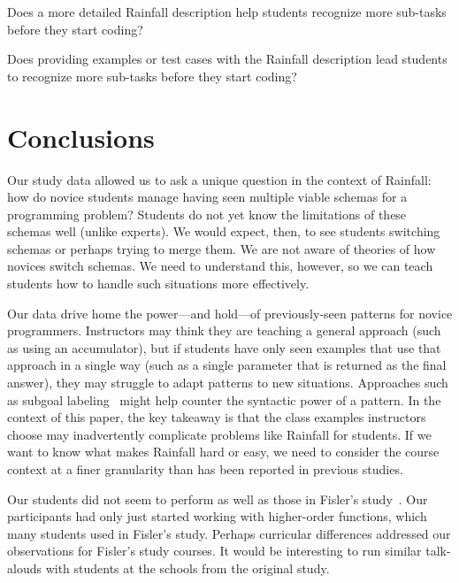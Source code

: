 \begin{openq}
Does a more detailed Rainfall description help students recognize
more sub-tasks before they start coding?
\end{openq}

\begin{openq}
Does providing examples or test cases with the Rainfall description
lead students to recognize more sub-tasks before they start coding?
\end{openq}





\section{Conclusions}

Our study data allowed us to ask a unique question in the context of
Rainfall: how do novice students manage having seen multiple viable
schemas for a programming problem?  Students
do not yet know the limitations of these schemas well (unlike experts). We would
expect, then, to see students switching schemas or perhaps trying to
merge them.  We are not aware of theories of how novices switch
schemas. We need to understand this, however, so we can teach students
how to handle such situations more effectively.

Our data drive home the power---and hold---of previously-seen patterns
for novice programmers.  Instructors may think they are teaching a
general approach (such as using an accumulator), but if students have
only seen examples that use that approach in a single way (such as a
single parameter that is returned as the final answer), they may
struggle to adapt patterns to new situations.  Approaches such as
subgoal labeling~\cite{catrambone-subgoals98} might help counter the syntactic
power of a pattern. In the context of this paper, the key
takeaway is that the class examples instructors choose may inadvertently
complicate problems like Rainfall for students.  If we want to know
what makes Rainfall hard or easy, we need to consider the course
context at a finer granularity than has been reported in previous
studies.

Our students did not seem to perform as well as those in
Fisler's study~\cite{fisler-recurring-rainfall14}.  
Our participants had only just
started working with higher-order functions, which many students used
in Fisler's study.  Perhaps curricular differences addressed our
observations for Fisler's study courses. It would be interesting to
run similar talk-alouds with students at the schools from the original
study.  %

